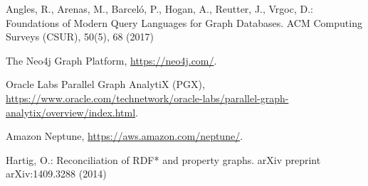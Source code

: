 \documentclass[runningheads]{llncs}
\begin{document}
%
%
%
% 
% 
%
\begin{thebibliography}{8}

Angles, R., Arenas, M., Barceló, P., Hogan, A., Reutter, J., Vrgoc, D.: Foundations of Modern Query Languages for Graph Databases. ACM Computing Surveys (CSUR), 50(5), 68 (2017)

The Neo4j Graph Platform, \url{https://neo4j.com/}.

Oracle Labs Parallel Graph AnalytiX (PGX), \url{https://www.oracle.com/technetwork/oracle-labs/parallel-graph-analytix/overview/index.html}.

Amazon Neptune, \url{https://aws.amazon.com/neptune/}.

Hartig, O.: Reconciliation of RDF* and property graphs. arXiv preprint arXiv:1409.3288 (2014)

\end{thebibliography}
\end{document}
